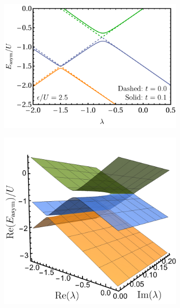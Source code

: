 \documentclass[aps,prb,reprint,noshowkeys,superscriptaddress]{revtex4-1}
\begin{document}
\begin{figure}[t]
	\begin{subfigure}{0.32\textwidth}
	\includegraphics[height=0.75\textwidth]{fig7a}	
		\subcaption{\label{subfig:rmp_cp}}
    \end{subfigure}
    \begin{subfigure}{0.32\textwidth}
	\includegraphics[height=0.75\textwidth]{fig7b}
		\subcaption{\label{subfig:rmp_cp_surf}}
    \end{subfigure}
    \begin{subfigure}{0.32\textwidth}

\end{subfigure}
\end{figure}
\end{document}
